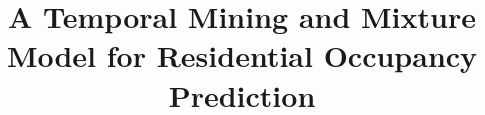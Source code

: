 \documentclass{llncs}
\begin{document}
%
\title{A Temporal Mining and Mixture Model for Residential Occupancy Prediction}


\maketitle

\end{document}
